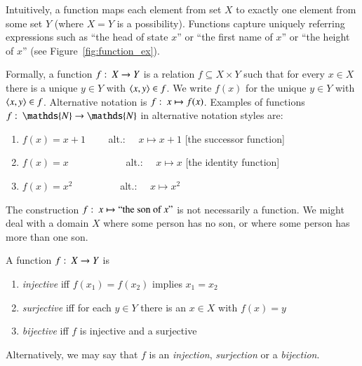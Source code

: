 \documentclass[nobib,nofonts]{tufte-handout}
\newcommand{\mygray}[1]{\textcolor{mygray2}{#1}}
\begin{document}
Intuitively, a function maps each element from set $X$ to exactly one element from some set $Y$
(where $X = Y$ is a possibility). Functions capture uniquely referring expressions
such as ``the head of state $x$'' or ``the first name of $x$'' or ``the height of $x$'' (see
Figure~\ref{fig:function_ex}).

Formally, a function $f \thinspace \colon \thinspace X \rightarrow Y$ is a relation
$f \subseteq X \times Y$ such that for every $x \in X$ there is a unique $y \in Y$ with
$\left \langle x,y\right\rangle \in f$. We write $f(x)$ for the unique $y \in Y$ with $\left \langle x,y\right\rangle \in
f$. Alternative notation is $f \thinspace \colon \thinspace x \mapsto f(x)$. Examples of functions
$f \mycolon \mathds{N} \rightarrow \mathds{N}$ in alternative
notation styles  are:
\begin{enumerate}
\item[] $f(x) = x +1$ \ \ \ \ alt.: \ \   $x \mapsto x + 1$ \hfill \mygray{[the successor function]}
\item[] $f(x) = x$ \ \  \ \ \ \ \ \ \ \ \ alt.: \ \ $x \mapsto x$ \hfill \mygray{[the identity function]}
\item[] $f(x) = x^2$ \  \ \ \ \ \ \ \ \ alt.: \ \ $x \mapsto x^2$ 
\end{enumerate}
The construction $f \thinspace \colon \thinspace x \mapsto \text{``the son of $x$''}$ is not necessarily a function. We
might deal with a domain $X$ where some person has no son, or where some person has more than one son.


A function $f \thinspace \colon \thinspace X \rightarrow Y$ is
\begin{enumerate}
\item[] \emph{injective} iff $f(x_1) = f(x_2)$ implies $x_1 = x_2$
\item[] \emph{surjective} iff for each $y \in Y$ there is an $x \in X$ with $f(x)=y$
\item[] \emph{bijective} iff $f$ is injective and a surjective
\end{enumerate}
Alternatively, we may say that $f$ is an \emph{injection}, \emph{surjection} or a
\emph{bijection}.
\end{document}
